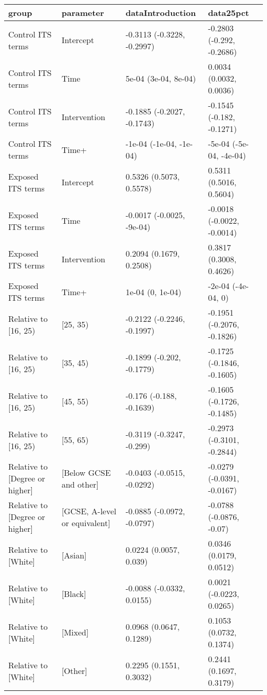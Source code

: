 \begin{table}[ht]
\centering
\begin{tabular}{llll}
  \hline
group & parameter & dataIntroduction & data25pct \\ 
  \hline
Control ITS terms & Intercept & -0.3113 (-0.3228, -0.2997) & -0.2803 (-0.292, -0.2686) \\ 
  Control ITS terms & Time & 5e-04 (3e-04, 8e-04) & 0.0034 (0.0032, 0.0036) \\ 
  Control ITS terms & Intervention & -0.1885 (-0.2027, -0.1743) & -0.1545 (-0.182, -0.1271) \\ 
  Control ITS terms & Time+ & -1e-04 (-1e-04, -1e-04) & -5e-04 (-5e-04, -4e-04) \\ 
  Exposed ITS terms & Intercept & 0.5326 (0.5073, 0.5578) & 0.5311 (0.5016, 0.5604) \\ 
  Exposed ITS terms & Time & -0.0017 (-0.0025, -9e-04) & -0.0018 (-0.0022, -0.0014) \\ 
  Exposed ITS terms & Intervention & 0.2094 (0.1679, 0.2508) & 0.3817 (0.3008, 0.4626) \\ 
  Exposed ITS terms & Time+ & 1e-04 (0, 1e-04) & -2e-04 (-4e-04, 0) \\ 
  Relative to [16, 25) & [25, 35) & -0.2122 (-0.2246, -0.1997) & -0.1951 (-0.2076, -0.1826) \\ 
  Relative to [16, 25) & [35, 45) & -0.1899 (-0.202, -0.1779) & -0.1725 (-0.1846, -0.1605) \\ 
  Relative to [16, 25) & [45, 55) & -0.176 (-0.188, -0.1639) & -0.1605 (-0.1726, -0.1485) \\ 
  Relative to [16, 25) & [55, 65) & -0.3119 (-0.3247, -0.299) & -0.2973 (-0.3101, -0.2844) \\ 
  Relative to [Degree or higher] & [Below GCSE and other] & -0.0403 (-0.0515, -0.0292) & -0.0279 (-0.0391, -0.0167) \\ 
  Relative to [Degree or higher] & [GCSE, A-level or equivalent] & -0.0885 (-0.0972, -0.0797) & -0.0788 (-0.0876, -0.07) \\ 
  Relative to [White] & [Asian] & 0.0224 (0.0057, 0.039) & 0.0346 (0.0179, 0.0512) \\ 
  Relative to [White] & [Black] & -0.0088 (-0.0332, 0.0155) & 0.0021 (-0.0223, 0.0265) \\ 
  Relative to [White] & [Mixed] & 0.0968 (0.0647, 0.1289) & 0.1053 (0.0732, 0.1374) \\ 
  Relative to [White] & [Other] & 0.2295 (0.1551, 0.3032) & 0.2441 (0.1697, 0.3179) \\ 

\end{tabular}
\end{table}
